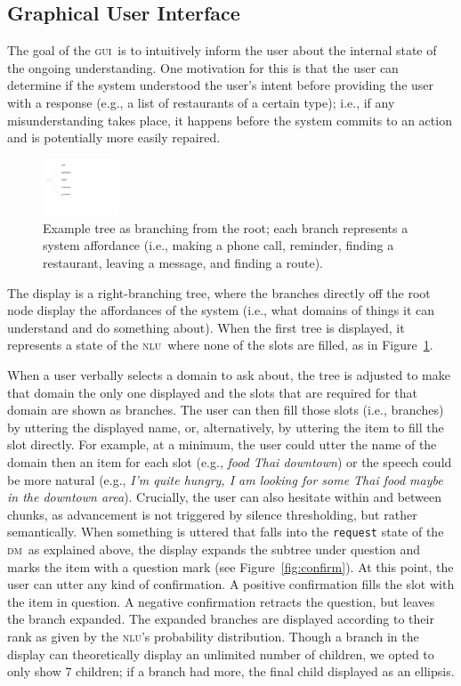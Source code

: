 \documentclass[11pt]{article}
\newcommand{\nlu}[0]{\textsc{nlu}}
\newcommand{\dm}[0]{\textsc{dm}}
\newcommand{\ui}[0]{\textsc{gui}}
\begin{document}
\subsection{Graphical User Interface}
\label{section:display}

The goal of the \ui\ is to intuitively inform the user about the internal state of the ongoing understanding. One motivation for this is that the user can determine if the system understood the user's intent before providing the user with a response (e.g., a list of restaurants of a certain type); i.e., if any misunderstanding takes place, it happens before the system commits to an action and is potentially more easily repaired. 

\begin{figure}
  \centering
      \includegraphics[width=0.2\textwidth]{figures/diatree-affordances.pdf}	
      \caption{Example tree as branching from the root; each branch represents a system affordance (i.e., making a phone call, reminder, finding a restaurant, leaving a message, and finding a route). \label{fig:affordances}}
\end{figure}

The display is a right-branching tree, where the branches directly off the root node display the affordances of the system (i.e., what domains of things it can understand and do something about). When the first tree is displayed, it represents a state of the \nlu\ where none of the slots are filled, as in Figure~\ref{fig:affordances}. 

When a user verbally selects a domain to ask about, the tree is adjusted to make that domain the only one displayed and the slots that are required for that domain are shown as branches. The user can then fill those slots (i.e., branches) by uttering the displayed name, or, alternatively, by uttering the item to fill the slot directly. For example, at a minimum, the user could utter the name of the domain then an item for each slot (e.g.,  \emph{food Thai downtown}) or the speech could be more natural (e.g., \emph{I'm quite hungry, I am looking for some Thai food maybe in the downtown area}). Crucially, the user can also hesitate within and between chunks, as advancement is not triggered by silence thresholding, but rather semantically.
When something is uttered that falls into the \texttt{request} state of the \dm\ as explained above, the display expands the subtree under question and marks the item with a question mark (see Figure~\ref{fig:confirm}). At this point, the user can utter any kind of confirmation. A positive confirmation fills the slot with the item in question. A negative confirmation retracts the question, but leaves the branch expanded. The expanded branches are displayed according to their rank as given by the \nlu's probability distribution. Though a branch in the display can theoretically display an unlimited number of children, we opted to only show 7 children; if a branch had more, the final child displayed as an ellipsis. 
\end{document}
